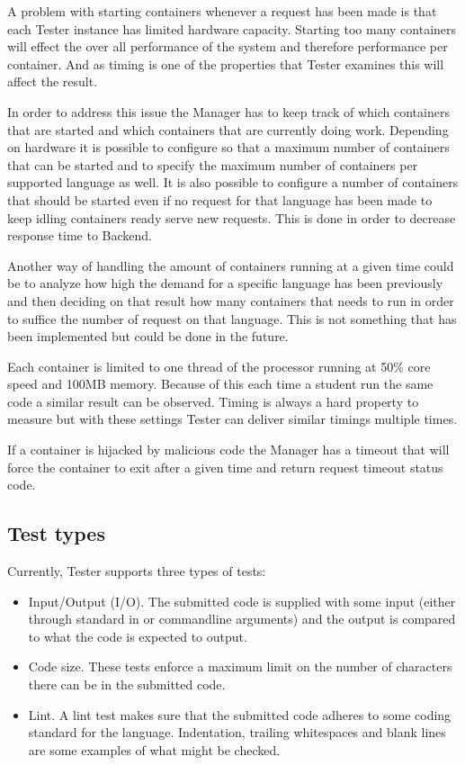 A problem with starting containers whenever a request has been made
is that each Tester instance has limited hardware capacity. Starting too many
containers will effect the over all performance of the system and therefore
performance per container. And as timing is one of the properties that Tester
examines this will affect the result.

In order to address this issue the Manager has to keep track of which containers
that are started and which containers that are currently doing work. Depending on
hardware it is possible to configure so that a maximum number of containers that
can be started and to specify the maximum number of containers
per supported language as well. It is also possible to configure a number of containers
that should be started even if no request for that language has been made to keep
idling containers ready serve new requests. This is done in order to decrease
response time to Backend.

Another way of handling the amount of containers running at a given time could
be to analyze how high the demand for a specific language has been previously and
then deciding on that result how many containers that needs to run in order to
suffice the number of request on that language. This is not something that has
been implemented but could be done in the future.

Each container is limited to one thread of the processor running at 50\% core speed and
100MB memory. Because of this each time a student run the same code a similar
result can be observed. Timing is always a hard property to measure but with
these settings Tester can deliver similar timings multiple times.

If a container is hijacked by malicious code the Manager has a timeout that will
force the container to exit after a given time and return request timeout status code.

\subsection{Test types}
Currently, Tester supports three types of tests:
\begin{itemize}
\item Input/Output (I/O). The submitted code is supplied with some input (either through standard in or commandline arguments) and the output is compared to what the code is expected to output.
\item Code size. These tests enforce a maximum limit on the number of characters there can be in the submitted code.
\item Lint. A lint test makes sure that the submitted code adheres to some coding standard for the language. Indentation, trailing whitespaces and blank lines are some examples of what might be checked.
\end{itemize}

